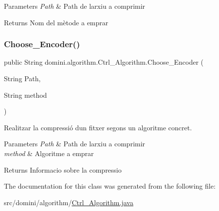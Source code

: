 \begin{DoxyParams}{Parameters}
{\em Path} & Path de l\textquotesingle{}arxiu a comprimir \\
\hline
\end{DoxyParams}
\begin{DoxyReturn}{Returns}
Nom del mètode a emprar 
\end{DoxyReturn}
\mbox{\label{classdomini_1_1algorithm_1_1Ctrl__Algorithm_a5af3b3afa4465c95093532396cecb8c7}} 
\subsubsection{\texorpdfstring{Choose\+\_\+\+Encoder()}{Choose\_Encoder()}}
{\footnotesize\ttfamily public String domini.\+algorithm.\+Ctrl\+\_\+\+Algorithm.\+Choose\+\_\+\+Encoder (\begin{DoxyParamCaption}\item[{String}]{Path,  }\item[{String}]{method }\end{DoxyParamCaption})\hspace{0.3cm}{\ttfamily [inline]}}



Realitzar la compressió d\textquotesingle{}un fitxer segons un algoritme concret. 


\begin{DoxyParams}{Parameters}
{\em Path} & Path de l\textquotesingle{}arxiu a comprimir \\
\hline
{\em method} & Algoritme a emprar \\
\hline
\end{DoxyParams}
\begin{DoxyReturn}{Returns}
Informacio sobre la compressio 
\end{DoxyReturn}


The documentation for this class was generated from the following file\+:\begin{DoxyCompactItemize}
\item 
src/domini/algorithm/\hyperlink{Ctrl__Algorithm_8java}{Ctrl\+\_\+\+Algorithm.\+java}\end{DoxyCompactItemize}
